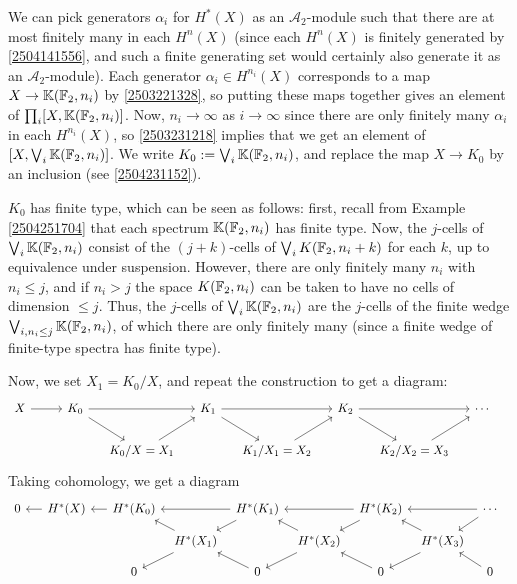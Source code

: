\documentclass{MetricNotes2023}
\def\bb{\ensuremath\mathbb}
\def\A{\ensuremath{\mathscr{A}_2}}
\begin{document}
We can pick generators \(\alpha_i\) for \(H^*(X)\) as an \(\mathscr{A}_2\)-module such that there are at most finitely many in each \(H^n(X)\) (since each \(H^n(X)\) is finitely generated by \ref{2504141556}, and such a finite generating set would certainly also generate it as an \(\A\)-module). Each generator \(\alpha_i\in H^{n_i}(X)\) corresponds to a map \(X \to \bb{K}(\bb{F}_2, n_i)\) by \ref{2503221328}, so putting these maps together gives an element of \(\prod_i [X, \bb{K}(\bb{F}_2, n_i)]\). Now, \(n_i \to\infty\) as \(i\to \infty\) since there are only finitely many \(\alpha_i\) in each \(H^{n_i}(X)\), so \ref{2503231218} implies that we get an element of \([X, \bigvee_i \bb{K}(\bb{F}_2, n_i)]\).  We write \(K_0 := \bigvee_i \bb{K}(\bb{F}_2, n_i)\), and replace the map \(X \to K_0\) by an inclusion (see \ref{2504231152}).

\begin{remark}
\(K_0\) has finite type, which can be seen as follows: first, recall from Example \ref{2504251704} that each spectrum \(\bb{K}(\bb{F}_2, n_i)\) has finite type. Now, the \(j\)-cells of \(\bigvee_i \bb{K}(\bb{F}_2, n_i)\) consist of the \((j+k)\)-cells of \(\bigvee_i K(\bb{F}_2, n_i+k)\) for each \(k\), up to equivalence under suspension. However, there are only finitely many \(n_i\) with \(n_i\leq j\), and if \(n_i>j\) the space \(K(\bb{F}_2, n_i)\) can be taken to have no cells of dimension \(\leq j\). Thus, the \(j\)-cells of \(\bigvee_i \bb{K}(\bb{F}_2, n_i)\) are the \(j\)-cells of the finite wedge \(\bigvee_{i, n_i\leq j}\bb{K}(\bb{F}_2, n_i)\), of which there are only finitely many (since a finite wedge of finite-type spectra has finite type). 
\end{remark}

Now, we set \(X_1=K_0/X\), and repeat the construction to get a diagram:
\begin{equation}\label{2503301114}
\begin{tikzcd}[column sep=3ex] 
 X \arrow[rr, ""]  & & K_0 \arrow[rr, ""] \arrow[dr, ""] & & K_1 \arrow[dr, ""] \arrow[rr, ""] & & K_2 \arrow[dr, ""] \arrow[rr, ""] & & \cdots \\ 
  &&& K_0/X=X_1 \arrow[ur, ""] & & K_1/X_1=X_2 \arrow[ur, ""] & & K_2/X_2=X_3 \arrow[ur, ""] &  &
 \end{tikzcd}\nonumber
\end{equation}
Taking cohomology, we get a diagram
\begin{equation}\label{2504251239}
\begin{tikzcd}[column sep=1.5ex, row sep = 2ex, arrows=<-]
 0 \arrow[rr, ""] && H^*(X) \arrow[rr,""] & & H^*(K_0) \arrow[rr, ""] \arrow[dr, ""] & & H^*(K_1) \arrow[dr, ""] \arrow[rr, ""] & & H^*(K_2) \arrow[dr, ""] \arrow[rr, ""] & & \cdots \\ 
  &&&&& H^*(X_1) \arrow[ur, ""] \arrow[dr] & & H^*(X_2) \arrow[ur, ""] \arrow[dr] & & H^*(X_3) \arrow[ur, ""] \arrow[dr] &  &\\
&&&& 0 \arrow[ur] && 0 \arrow[ur] && 0 \arrow[ur] && 0
 \end{tikzcd}
\end{equation}
\end{document}
